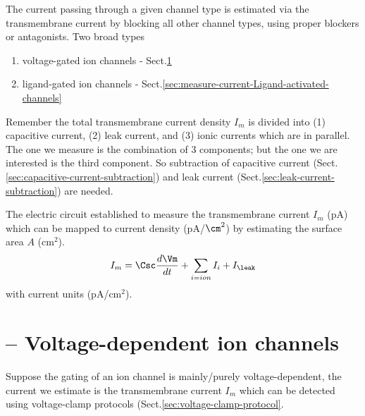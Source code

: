 The current passing through a given channel type is estimated via the
transmembrane current by blocking all other channel types, using proper blockers
or antagonists. Two broad types
\begin{enumerate}
  \item voltage-gated ion channels - Sect.\ref{sec:data-acquisition}

  \item ligand-gated ion channels -
  Sect.\ref{sec:measure-current-Ligand-activated-channels}
\end{enumerate}

Remember the total transmembrane current density $I_m$ is divided into
(1) capacitive current, (2) leak current, and (3) ionic currents which are in
parallel. The one we measure is the combination of 3 components; but the one we
are interested is the third component. So subtraction of capacitive current
(Sect.\ref{sec:capacitive-current-subtraction}) and leak current
(Sect.\ref{sec:leak-current-subtraction}) are needed.

The electric circuit established to measure the transmembrane current
$I_m$ (pA) which can be mapped to current density (pA/$\cm^2$) by estimating
the surface area $A$ (cm$^2$).
\begin{equation}
I_m = \Csc \frac{d\Vm}{dt} + \sum_{i=ion} I_{i} + I_\leak
\end{equation}
with current units (pA/cm$^2$).



 
\section{-- Voltage-dependent ion channels}
\label{sec:data-acquisition}
\label{sec:measure-current-Voltage-activated-channels}

Suppose the gating of an ion channel is mainly/purely voltage-dependent, the
current we estimate is the transmembrane current $I_m$ which can be detected
using voltage-clamp protocols (Sect.\ref{sec:voltage-clamp-protocol}.

